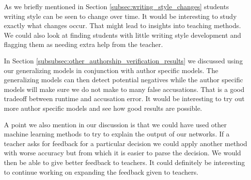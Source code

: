 As we briefly mentioned in Section \ref{subsec:writing_style_changes} students
writing style can be seen to change over time. It would be interesting to study
exactly what changes occur. That might lead to insights into teaching methods.
We could also look at finding students with little writing style development and
flagging them as needing extra help from the teacher.

In Section \ref{subsubsec:other_authorship_verification_results} we discussed
using our generalizing models in conjunction with author specific models. The
generalizing models can then detect potential negatives while the author
specific models will make sure we do not make to many false accusations. That is
a good tradeoff between runtime and accusation error. It would be interesting to
try out more author specific models and see how good results are possible.

A point we also mention in our discussion is that we could have used other
machine learning methods to try to explain the output of our networks. If a
teacher asks for feedback for a particular decision we could apply another
method with worse accuracy but from which it is easier to parse the decision.
We would then be able to give better feedback to teachers. It could definitely
be interesting to continue working on expanding the feedback given to teachers.
